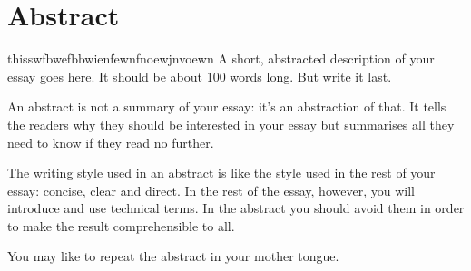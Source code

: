 
\chapter*{Abstract} 
thisswfbwefbbwienfewnfnoewjnvoewn
A short, abstracted description of your essay goes here. 
It should be about 100 words long. But write it last.

An abstract is not a summary of your essay: it's an abstraction of that. 
It tells the readers why they should be interested in your essay but summarises all
they need to know if they read no further.

The writing style used in an abstract is like the style used in the rest of your essay: concise, clear and direct. 
In the rest of the essay, however, you will introduce and use technical terms. In the abstract you should
avoid them in order to make the result comprehensible to all.

You may like to repeat the abstract in your mother tongue.





